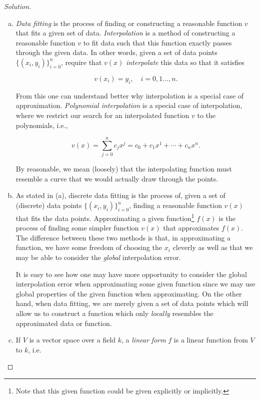 \documentclass[12pt,a4]{article}
\theoremstyle{definition}
\begin{document}
\begin{proof}[Solution]
	\begin{enumerate}[(a)]
		\item \emph{Data fitting} is the process of finding or constructing a reasonable function $v$ that fits a given set of data. \emph{Interpolation} is a method of constructing a reasonable function $v$ to fit data such that this function exactly passes through the given data. In other words, given a set of data points $\{ (x_i, y_i) \}_{i = 0}^n$, require that $v(x)$ \emph{interpolate} this data so that it satisfies 
		
		\[
		v(x_i) = y_i {,} \quad i = 0, 1 \ldots, n {.}
		\]		
		
		From this one can understand better why interpolation is a special case of approximation. \emph{Polynomial interpolation} is a special case of interpolation, where we restrict our search for an interpolated function $v$ to the polynomials, i.e., 
		
		\[
		v(x) = \sum_{j = 0}^{n} c_j x^j = c_0 + c_1 x^1 + \cdots + c_n x^n {.}
		\]
		
		By reasonable, we mean (loosely) that the interpolating function must resemble a curve that we would actually draw through the points. 
		
		\item As stated in (a), discrete data fitting is the process of, given a set of (discrete) data points $\{ (x_i, y_i) \}_{i = 0}^n$, finding a reasonable function $v(x)$ that fits the data points. Approximating a given function\footnote{Note that this given function could be given explicitly or implicitly.} $f(x)$ is the process of finding some simpler function $v(x)$ that approximates $f(x)$. The difference between these two methods is that, in approximating a function, we have some freedom of choosing the $x_i$ cleverly as well as that we may be able to consider the \emph{global} interpolation error. 
		
		It is easy to see how one may have more opportunity to consider the global interpolation error when approximating some given function since we may use global properties of the given function when approximating. On the other hand, when data fitting, we are merely given a set of data points which will allow us to construct a function which only \emph{locally} resembles the approximated data or function. 
		
		\item If $V$ is a vector space over a field $k$, a \emph{linear form} $f$ is a linear function from $V$ to $k$, i.e.
		

\end{enumerate}
\end{proof}
\end{document}
